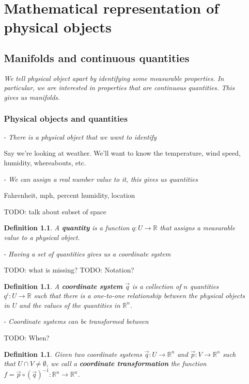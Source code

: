 \documentclass{book}
\newtheorem{defn}[equation]{Definition}
\begin{document}
\tableofcontents

\chapter{Mathematical representation of physical objects}



\section{Manifolds and continuous quantities}
\emph{We tell physical object apart by identifying some measurable properties. In particular, we are interested in properties that are continuous quantities. This gives us manifolds.}

\subsection{Physical objects and quantities}

- \emph{There is a physical object that we want to identify}

Say we're looking at weather. We'll want to know the temperature, wind speed, humidity, whereabouts, etc.

- \emph{We can assign a real number value to it, this gives us quantities}

Fahrenheit, mph, percent humidity, location 

TODO: talk about subset of space



\begin{defn}
	A \textbf{quantity} is a function $q : U \to \mathbb{R}$ that assigns a measurable value to a physical object.
\end{defn}


- \emph{Having a set of quantities gives us a coordinate system}

TODO: what is missing?
TODO: Notation?

\begin{defn}
	A \textbf{coordinate system} $\vec{q}$ is a collection of $n$ quantities $q^i : U \to \mathbb{R}$ such that there is a one-to-one relationship between the physical objects in $U$ and the values of the quantities in $\mathbb{R}^n$.
\end{defn}


- \emph{Coordinate systems can be transformed between}

TODO: When?

\begin{defn}
	Given two coordinate systems  $\vec{q} : U \to \mathbb{R}^n$ and $\vec{p} : V \to \mathbb{R}^n$ such that $U \cap V \neq \emptyset$, we call a \textbf{coordinate transformation} the function $f = \vec{p} \circ (\vec{q})^{-1} : \mathbb{R}^n \to \mathbb{R}^n$.
\end{defn}
\end{document}
